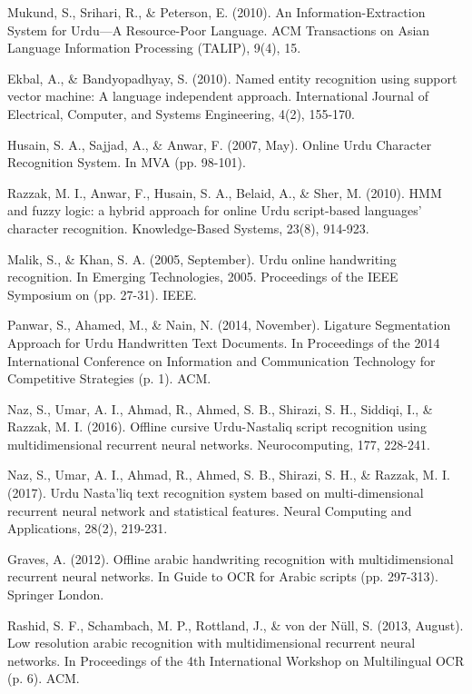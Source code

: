 \begin{thebibliography}{130}
Mukund, S., Srihari, R., \& Peterson, E. (2010). An Information-Extraction System for Urdu---A Resource-Poor Language. ACM Transactions on Asian Language Information Processing (TALIP), 9(4), 15.

Ekbal, A., \& Bandyopadhyay, S. (2010). Named entity recognition using support vector machine: A language independent approach. International Journal of Electrical, Computer, and Systems Engineering, 4(2), 155-170.

Husain, S. A., Sajjad, A., \& Anwar, F. (2007, May). Online Urdu Character Recognition System. In MVA (pp. 98-101).

Razzak, M. I., Anwar, F., Husain, S. A., Belaid, A., \& Sher, M. (2010). HMM and fuzzy logic: a hybrid approach for online Urdu script-based languages’ character recognition. Knowledge-Based Systems, 23(8), 914-923.

Malik, S., \& Khan, S. A. (2005, September). Urdu online handwriting recognition. In Emerging Technologies, 2005. Proceedings of the IEEE Symposium on (pp. 27-31). IEEE.

Panwar, S., Ahamed, M., \& Nain, N. (2014, November). Ligature Segmentation Approach for Urdu Handwritten Text Documents. In Proceedings of the 2014 International Conference on Information and Communication Technology for Competitive Strategies (p. 1). ACM.

Naz, S., Umar, A. I., Ahmad, R., Ahmed, S. B., Shirazi, S. H., Siddiqi, I., \& Razzak, M. I. (2016). Offline cursive Urdu-Nastaliq script recognition using multidimensional recurrent neural networks. Neurocomputing, 177, 228-241.

Naz, S., Umar, A. I., Ahmad, R., Ahmed, S. B., Shirazi, S. H., \& Razzak, M. I. (2017). Urdu Nasta’liq text recognition system based on multi-dimensional recurrent neural network and statistical features. Neural Computing and Applications, 28(2), 219-231.

Graves, A. (2012). Offline arabic handwriting recognition with multidimensional recurrent neural networks. In Guide to OCR for Arabic scripts (pp. 297-313). Springer London.

Rashid, S. F., Schambach, M. P., Rottland, J., \& von der Nüll, S. (2013, August). Low resolution arabic recognition with multidimensional recurrent neural networks. In Proceedings of the 4th International Workshop on Multilingual OCR (p. 6). ACM.


\end{thebibliography}
